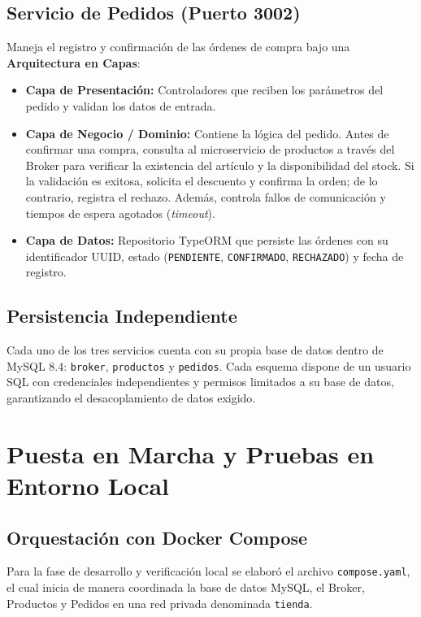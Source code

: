 \documentclass[conference]{IEEEtran}
\begin{document}
\subsection{Servicio de Pedidos (Puerto 3002)}
Maneja el registro y confirmación de las órdenes de compra bajo una \textbf{Arquitectura en Capas}:
\begin{itemize}
    \item \textbf{Capa de Presentación:} Controladores que reciben los parámetros del pedido y validan los datos de entrada.
    \item \textbf{Capa de Negocio / Dominio:} Contiene la lógica del pedido. Antes de confirmar una compra, consulta al microservicio de productos a través del Broker para verificar la existencia del artículo y la disponibilidad del stock. Si la validación es exitosa, solicita el descuento y confirma la orden; de lo contrario, registra el rechazo. Además, controla fallos de comunicación y tiempos de espera agotados (\textit{timeout}).
    \item \textbf{Capa de Datos:} Repositorio TypeORM que persiste las órdenes con su identificador UUID, estado (\texttt{PENDIENTE}, \texttt{CONFIRMADO}, \texttt{RECHAZADO}) y fecha de registro.
\end{itemize}

\subsection{Persistencia Independiente}
Cada uno de los tres servicios cuenta con su propia base de datos dentro de MySQL 8.4: \texttt{broker}, \texttt{productos} y \texttt{pedidos}. Cada esquema dispone de un usuario SQL con credenciales independientes y permisos limitados a su base de datos, garantizando el desacoplamiento de datos exigido.

\section{Puesta en Marcha y Pruebas en Entorno Local}

\subsection{Orquestación con Docker Compose}
Para la fase de desarrollo y verificación local se elaboró el archivo \texttt{compose.yaml}, el cual inicia de manera coordinada la base de datos MySQL, el Broker, Productos y Pedidos en una red privada denominada \texttt{tienda}.
\end{document}
